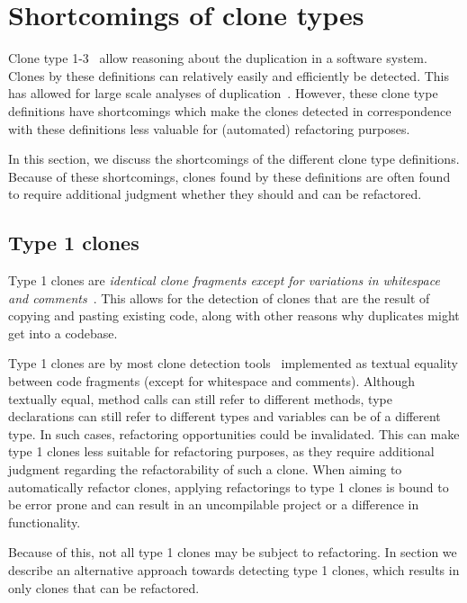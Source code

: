 \documentclass[a4paper]{article}
\begin{document}
\section{Shortcomings of clone types}
Clone type 1-3~\cite{roy2007survey} allow reasoning about the duplication in a software system. Clones by these definitions can relatively easily and efficiently be detected. This has allowed for large scale analyses of duplication~\cite{livieri2007very}. However, these clone type definitions have shortcomings which make the clones detected in correspondence with these definitions less valuable for (automated) refactoring purposes.

In this section, we discuss the shortcomings of the different clone type definitions. Because of these shortcomings, clones found by these definitions are often found to require additional judgment whether they should and can be refactored.

\subsection{Type 1 clones} \label{sec:type1}
Type 1 clones are \textit{identical clone fragments except for variations in whitespace and comments}~\cite{roy2007survey}. This allows for the detection of clones that are the result of copying and pasting existing code, along with other reasons why duplicates might get into a codebase.

Type 1 clones are by most clone detection tools~\cite{kamiya2002ccfinder, semura2017ccfindersw, roy2008nicad, svajlenko2016bigcloneeval, svajlenko2014evaluating} implemented as textual equality between code fragments (except for whitespace and comments). Although textually equal, method calls can still refer to different methods, type declarations can still refer to different types and variables can be of a different type. In such cases, refactoring opportunities could be invalidated. This can make type 1 clones less suitable for refactoring purposes, as they require additional judgment regarding the refactorability of such a clone. When aiming to automatically refactor clones, applying refactorings to type 1 clones is bound to be error prone and can result in an uncompilable project or a difference in functionality.

Because of this, not all type 1 clones may be subject to refactoring. In section \label{chap:type1rclones} we describe an alternative approach towards detecting type 1 clones, which results in only clones that can be refactored.
\end{document}
